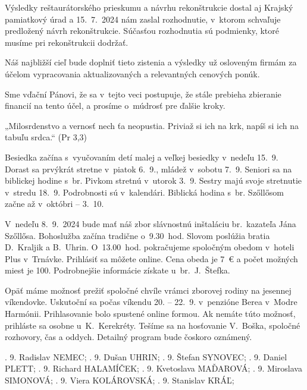 Výsledky reštaurátorského prieskumu a návrhu rekonštrukcie dostal aj Krajský pamiatkový úrad a 15.~7.~2024 nám zaslal rozhodnutie, v~ktorom schvaľuje predložený návrh rekonštrukcie. Súčasťou rozhodnutia sú podmienky, ktoré musíme pri rekonštrukcii dodržať.

Náš najbližší cieľ bude doplniť tieto zistenia a výsledky už osloveným firmám za účelom vypracovania aktualizovaných a relevantných cenových ponúk.

Sme vďační Pánovi, že sa v~tejto veci postupuje, že stále prebieha zbieranie financií na tento účel, a prosíme o~múdrosť pre ďalšie kroky.




„Milosrdenstvo a vernosť nech ťa neopustia. Priviaž si ich na krk, napíš si ich na tabuľu srdca.“ (Pr 3,3)
 


Besiedka začína s~vyučovaním detí malej a veľkej besiedky v~nedeľu 15.~9. Dorast sa prvýkrát stretne v~piatok 6.~9., mládež v~sobotu 7.~9. Seniori sa na biblickej hodine s~br. Pivkom stretnú v~utorok 3.~9. Sestry majú svoje stretnutie v~stredu 18.~9. Podrobnosti sú v~kalendári. Biblická hodina s~br. Szőllősom začne až v~októbri -- 3.~10.



V~nedeľu 8.~9.~2024 bude mať náš zbor slávnostnú inštaláciu br.~kazateľa Jána Szőllősa. Bohoslužba začína tradične o~9.30~hod. Slovom poslúžia bratia D.~Kraljik a B.~Uhrin. O~13.00~hod. pokračujeme spoločným obedom v~hoteli Plus v~Trnávke. Prihlásiť sa môžete online. Cena obeda je 7~€ a počet možných miest je 100. Podrobnejšie informácie získate u~br.~J.~Štefka.
\vfill\break



Opäť máme možnosť prežiť spoločné chvíle vrámci zborovej rodiny na jesennej víkendovke. Uskutoční sa počas víkendu 20. -- 22.~9.
v~penzióne Berea v~Modre Harmónii. Prihlasovanie bolo spustené online formou. Ak nemáte túto možnosť, prihláste sa osobne u~K.~Kerekréty.
Tešíme sa na hosťovanie V.~Boška, spoločné rozhovory, čas a oddych. Detailný program bude čoskoro oznámený.


.	9.	Radislav	NEMEC;
.	9.	Dušan	UHRIN;
.	9.	Štefan	SYNOVEC;
.	9.	Daniel	PLETT;
.	9.	Richard	HALAMÍČEK;
.	9.	Kvetoslava	MAĎAROVÁ;
.	9.	Miroslava	SIMONOVÁ;
.	9.	Viera	KOLÁROVSKÁ;
.	9.	Stanislav	KRÁĽ;
\narodeniny


